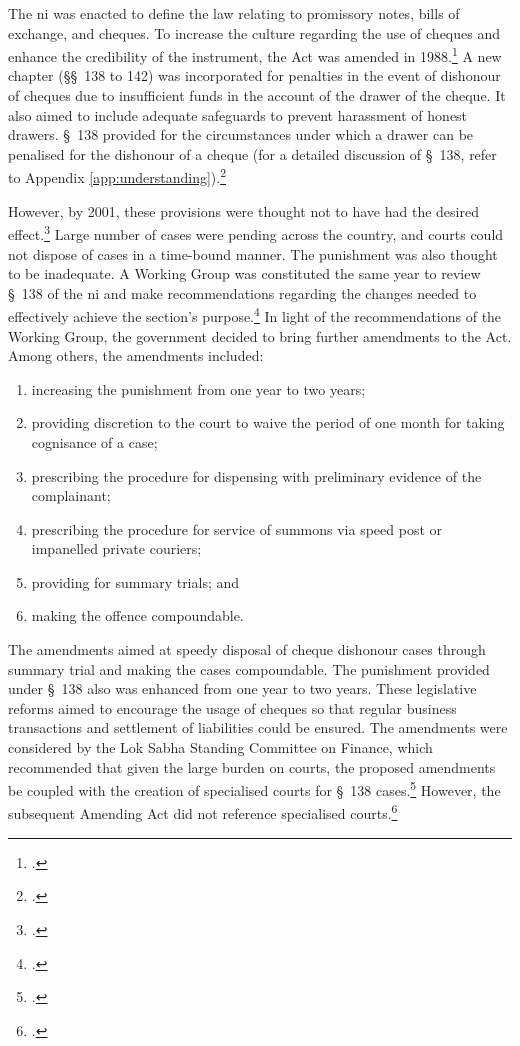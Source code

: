 \documentclass[12pt,a4paper]{article}
\begin{document}
The \acrlong{ni} was enacted to define the law relating to promissory notes, bills of exchange, and cheques. To increase the culture regarding the use of cheques and enhance the credibility of the instrument, the Act was amended in 1988.\footcite{niAmend1988} A new chapter (\S\S~138 to 142) was incorporated for penalties in the event of dishonour of cheques due to insufficient funds in the account of the drawer of the cheque. It also aimed to include adequate safeguards to prevent harassment of honest drawers. \S~138 provided for the circumstances under which a drawer can be penalised for the dishonour of a cheque (for a detailed discussion of \S~138, refer to Appendix \ref{app:understanding}).\footcite{ind1881_niAct}

However, by 2001, these provisions were thought not to have had the desired effect.\footcite{stdcomm2001_138niAct} Large number of cases were pending across the country, and courts could not dispose of cases in a time-bound manner. The punishment was also thought to be inadequate. A Working Group was constituted the same year to review \S~138 of the \gls{ni} and make recommendations regarding the changes needed to effectively achieve the section's purpose.\footcite{wg2001_138} In light of the recommendations of the Working Group, the government decided to bring further amendments to the Act. Among others, the amendments included:

\begin{enumerate}[label=(\alph*)]
\item increasing the punishment from one year to two years;
\item providing discretion to the court to waive the period of one month for taking cognisance of a case;
\item prescribing the procedure for dispensing with preliminary evidence of the complainant;
\item prescribing the procedure for service of summons via speed post or impanelled private couriers;
\item providing for summary trials; and
\item making the offence compoundable.
\end{enumerate}

The amendments aimed at speedy disposal of cheque dishonour cases through summary trial and making the cases compoundable. The punishment provided under \S~138 also was enhanced from one year to two years. These legislative
reforms aimed to encourage the usage of cheques so that regular business transactions and settlement of liabilities could be ensured. The amendments were considered by the Lok Sabha Standing Committee on Finance, which recommended that given the large burden on courts, the proposed amendments be coupled with the creation of specialised courts for \S~138 cases.\footcite{stdcomm2001_138niAct} However, the subsequent Amending Act did not reference specialised courts.\footcite{niAmend2002}
\end{document}
